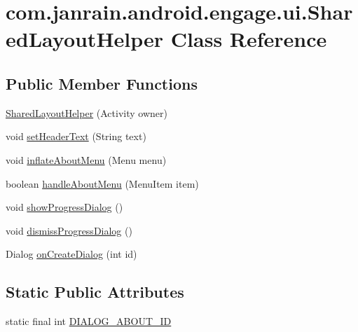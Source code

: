 \hypertarget{classcom_1_1janrain_1_1android_1_1engage_1_1ui_1_1_shared_layout_helper}{
\section{com.janrain.android.engage.ui.SharedLayoutHelper Class Reference}
\label{classcom_1_1janrain_1_1android_1_1engage_1_1ui_1_1_shared_layout_helper}
}
\subsection*{Public Member Functions}
\begin{DoxyCompactItemize}
\item 
\hyperlink{classcom_1_1janrain_1_1android_1_1engage_1_1ui_1_1_shared_layout_helper_a35493f5302603587dbc52ae67adb7afe}{SharedLayoutHelper} (Activity owner)
\item 
void \hyperlink{classcom_1_1janrain_1_1android_1_1engage_1_1ui_1_1_shared_layout_helper_aa21a00f9f15bfe08d78c76cedfec87d7}{setHeaderText} (String text)
\item 
void \hyperlink{classcom_1_1janrain_1_1android_1_1engage_1_1ui_1_1_shared_layout_helper_a104ffb2bd5c63e245f261840f898cf23}{inflateAboutMenu} (Menu menu)
\item 
boolean \hyperlink{classcom_1_1janrain_1_1android_1_1engage_1_1ui_1_1_shared_layout_helper_a3d168c1c0cfe95395750b318e9209598}{handleAboutMenu} (MenuItem item)
\item 
void \hyperlink{classcom_1_1janrain_1_1android_1_1engage_1_1ui_1_1_shared_layout_helper_a0948a2b991d60e62d4e13207a4b61a99}{showProgressDialog} ()
\item 
void \hyperlink{classcom_1_1janrain_1_1android_1_1engage_1_1ui_1_1_shared_layout_helper_a15ae9058b23e8f46f4985bb995f2ac5f}{dismissProgressDialog} ()
\item 
Dialog \hyperlink{classcom_1_1janrain_1_1android_1_1engage_1_1ui_1_1_shared_layout_helper_ac331699d8854ac78dc844cdf1ec2e129}{onCreateDialog} (int id)
\end{DoxyCompactItemize}
\subsection*{Static Public Attributes}
\begin{DoxyCompactItemize}
\item 
static final int \hyperlink{classcom_1_1janrain_1_1android_1_1engage_1_1ui_1_1_shared_layout_helper_ac040a291f9c62449d43968e317099e54}{DIALOG\_\-ABOUT\_\-ID}
\end{DoxyCompactItemize}



